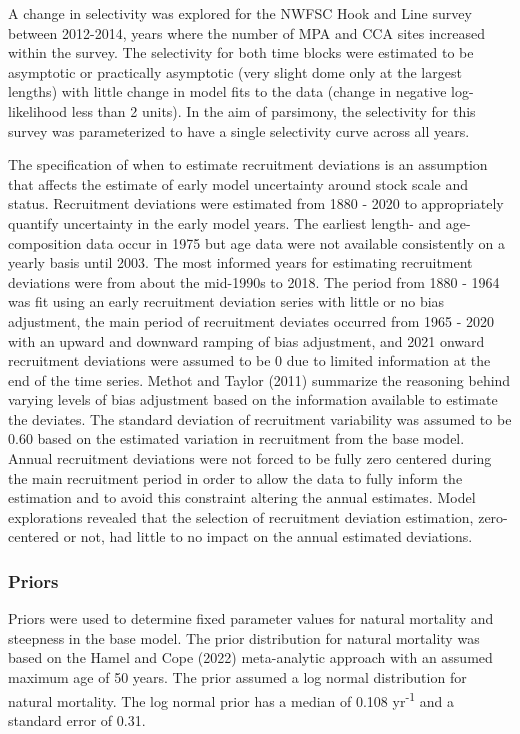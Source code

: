 \documentclass[11pt,
  english,
  letterpaper,
]{article}
\begin{document}
A change in selectivity was explored for the NWFSC Hook and Line survey between 2012-2014, years where the number of MPA and CCA sites increased within the survey. The selectivity for both time blocks were estimated to be asymptotic or practically asymptotic (very slight dome only at the largest lengths) with little change in model fits to the data (change in negative log-likelihood less than 2 units). In the aim of parsimony, the selectivity for this survey was parameterized to have a single selectivity curve across all years.

The specification of when to estimate recruitment deviations is an assumption that affects the estimate of early model uncertainty around stock scale and status. Recruitment deviations were estimated from 1880 - 2020 to appropriately quantify uncertainty in the early model years. The earliest length- and age-composition data occur in 1975 but age data were not available consistently on a yearly basis until 2003. The most informed years for estimating recruitment deviations were from about the mid-1990s to 2018. The period from 1880 - 1964 was fit using an early recruitment deviation series with little or no bias adjustment, the main period of recruitment deviates occurred from 1965 - 2020 with an upward and downward ramping of bias adjustment, and 2021 onward recruitment deviations were assumed to be 0 due to limited information at the end of the time series. Methot and Taylor (2011) summarize the reasoning behind varying levels of bias adjustment based on the information available to estimate the deviates. The standard deviation of recruitment variability was assumed to be 0.60 based on the estimated variation in recruitment from the base model. Annual recruitment deviations were not forced to be fully zero centered during the main recruitment period in order to allow the data to fully inform the estimation and to avoid this constraint altering the annual estimates. Model explorations revealed that the selection of recruitment deviation estimation, zero-centered or not, had little to no impact on the annual estimated deviations.

\hypertarget{priors}{%
\subsubsection{Priors}\label{priors}}

Priors were used to determine fixed parameter values for natural mortality and steepness in the base model. The prior distribution for natural mortality was based on the Hamel and Cope (2022) meta-analytic approach with an assumed maximum age of 50 years. The prior assumed a log normal distribution for natural mortality. The log normal prior has a median of 0.108 yr\textsuperscript{-1} and a standard error of 0.31.
\end{document}
